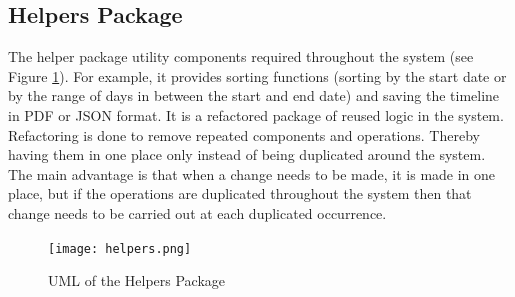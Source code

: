 \subsection{Helpers Package}
\par The helper package  utility components required throughout the system (see Figure \ref{fig:helpers}). For example, it provides sorting functions (sorting by the start date or by the range of days in between the start and end date) and saving the timeline in PDF or JSON format. It is a refactored package of reused logic in the system. Refactoring is done to remove repeated components and operations. Thereby having them in one place only instead of being duplicated around the system. The main advantage is that when a change needs to be made, it is made in one place, but if the operations are duplicated throughout the system then that change needs to be carried out at each duplicated occurrence.
\begin{figure}[H]
\caption{UML of the Helpers Package}
\label{fig:helpers}
\texttt{[image: helpers.png]}
\centering
\end{figure}

